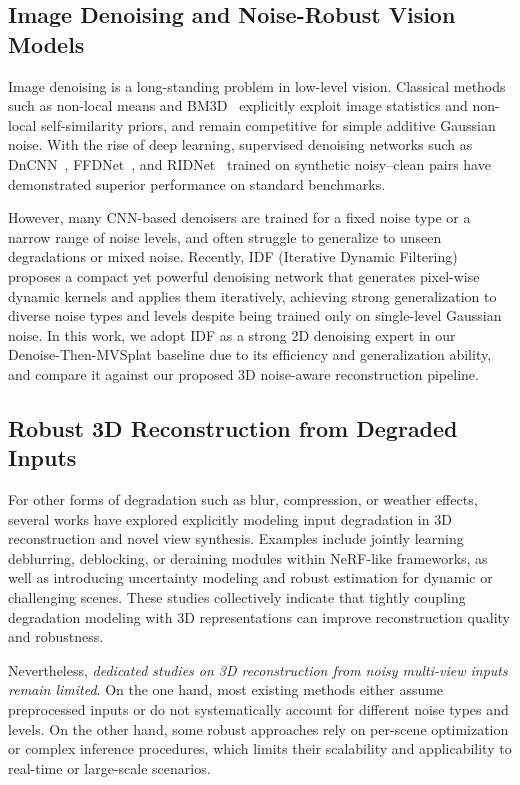 \subsection{Image Denoising and Noise-Robust Vision Models}

Image denoising is a long-standing problem in low-level vision. Classical methods such as non-local means and BM3D~\cite{dabov2007bm3d} explicitly exploit image statistics and non-local self-similarity priors, and remain competitive for simple additive Gaussian noise. With the rise of deep learning, supervised denoising networks such as DnCNN~\cite{zhang2017dncnn}, FFDNet~\cite{zhang2018ffdnet}, and RIDNet~\cite{anwar2019ridnet} trained on synthetic noisy--clean pairs have demonstrated superior performance on standard benchmarks.

However, many CNN-based denoisers are trained for a fixed noise type or a narrow range of noise levels, and often struggle to generalize to unseen degradations or mixed noise. 
Recently, IDF (Iterative Dynamic Filtering)~\cite{kim2025idf} proposes a compact yet powerful denoising network that generates pixel-wise dynamic kernels and applies them iteratively, achieving strong generalization to diverse noise types and levels despite being trained only on single-level Gaussian noise. 
In this work, we adopt IDF as a strong 2D denoising expert in our Denoise-Then-MVSplat baseline due to its efficiency and generalization ability, and compare it against our proposed 3D noise-aware reconstruction pipeline.

\subsection{Robust 3D Reconstruction from Degraded Inputs}

For other forms of degradation such as blur, compression, or weather effects, several works have explored explicitly modeling input degradation in 3D reconstruction and novel view synthesis. Examples include jointly learning deblurring, deblocking, or deraining modules within NeRF-like frameworks, as well as introducing uncertainty modeling and robust estimation for dynamic or challenging scenes. These studies collectively indicate that tightly coupling degradation modeling with 3D representations can improve reconstruction quality and robustness.

Nevertheless, \emph{dedicated studies on 3D reconstruction from noisy multi-view inputs remain limited}. On the one hand, most existing methods either assume preprocessed inputs or do not systematically account for different noise types and levels. On the other hand, some robust approaches rely on per-scene optimization or complex inference procedures, which limits their scalability and applicability to real-time or large-scale scenarios.

